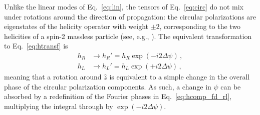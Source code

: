 \documentclass[aps,prd,twocolumn,superscriptaddress,preprintnumbers,floatfix,nofootinbib]{revtex4-2}
\newcommand*{\eq}[1]{Eq.~\eqref{eq:#1}}
\begin{document}
Unlike the linear modes of Eq.~\eqref{eq:lin}, the tensors of Eq.~\eqref{eq:circ} do not mix under rotations around the direction of propagation:
the circular polarizations are eigenstates of the helicity operator with weight $\pm 2$, corresponding to the two helicities of a spin-2 massless particle (see, e.g., \cite{Hinterbichler2011}).
The equivalent transformation to Eq.~\eqref{eq:htransf} is
\begin{subequations} \label{eq:htransf_circ}
\begin{align}
h_R &\rightarrow h_R' = h_R \exp(- i2  \Delta \psi) \, ,\\
h_L &\rightarrow h_L' = h_L \exp(+ i2  \Delta \psi)\, ,
\end{align}
\end{subequations}
meaning that a rotation around $\hat{z}$ is equivalent to a simple change in the overall phase of the circular polarization components.
As such, a change in $\psi$ can be absorbed by a redefinition of the Fourier phases in \eq{hcomp_fd_rl}, multiplying the integral through by $\exp(-i2\Delta\psi)$.
\end{document}
